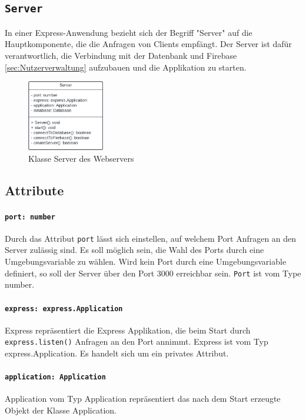 \documentclass{entwurfsheft}
\begin{document}
\newpage

\subsection{\texttt{Server}}\label{sec:Server}
In einer Express-Anwendung bezieht sich der Begriff "Server" auf die Hauptkomponente, die die Anfragen von Clients empfängt.
Der Server ist dafür verantwortlich, die Verbindung mit der Datenbank und Firebase \ref{sec:Nutzerverwaltung} aufzubauen und die Applikation zu starten.

\begin{figure}[htp]
    \centering
    \includegraphics[width = 0.3\textwidth]{images/webserver/server.pdf}
    \caption{Klasse Server des Webservers}
    \label{fig:server}
\end{figure}

\subsection*{Attribute}
\paragraph{\texttt{port: number}}
Durch das Attribut \texttt{port} lässt sich einstellen, auf welchem Port Anfragen an den Server zulässig sind. Es soll möglich sein, die Wahl des Ports durch eine Umgebungsvariable zu wählen. Wird kein Port durch eine Umgebungsvariable definiert, so soll der Server über den Port 3000 erreichbar sein.
\texttt{Port} ist vom Type number.
\paragraph{\texttt{express: express.Application}}
Express repräsentiert die Express Applikation, die beim Start durch \texttt{express.listen()} Anfragen an den Port annimmt.
Express ist vom Typ express.Application. Es handelt sich um ein privates Attribut.
\paragraph{\texttt{application: Application}}
Application vom Typ Application repräsentiert das nach dem Start erzeugte Objekt der Klasse Application.
\end{document}
